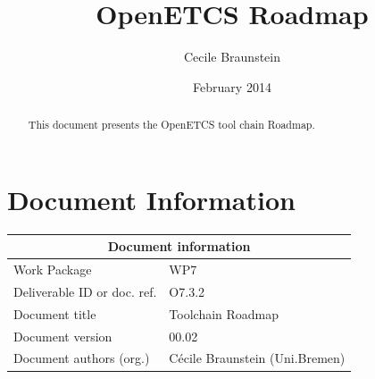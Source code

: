 \documentclass{openetcs_report}
\begin{document}
\frontmatter
{}




\title{OpenETCS Roadmap}


\date{February 2014}


\author{Cecile Braunstein}







\begin{abstract}
This document presents the OpenETCS tool chain Roadmap.
\end{abstract}


\maketitle
\tableofcontents

\newpage

\chapter{Document Information}

\begin{tabular}{|p{4.4cm}|p{8.7cm}|}
\hline
\multicolumn{2}{|c|}{Document information} \\
\hline
Work Package &  WP7  \\
Deliverable ID or doc. ref. & O7.3.2\\
\hline
Document title & Toolchain Roadmap \\
Document version & 00.02 \\
Document authors (org.)  & Cécile Braunstein (Uni.Bremen) \\
\hline
\end{tabular}
\end{document}
